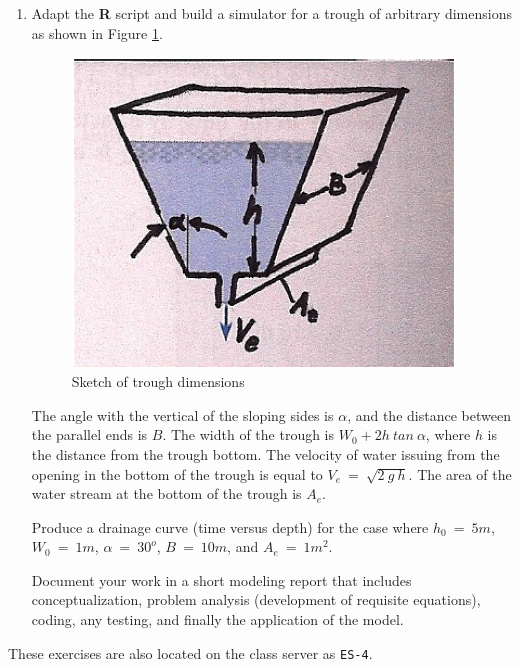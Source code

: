 \begin{enumerate}
\item Adapt the \textbf{R} script and build a simulator for a trough of arbitrary dimensions as shown in Figure \ref{fig:trough}.  

\begin{figure}[h!] %
   \centering
   \includegraphics[width=4in]{./4-TankDrain/trough.jpg} 
   \caption{Sketch of trough dimensions}
   \label{fig:trough}
\end{figure}

The angle with the vertical of the sloping sides is $\alpha$, and the distance between the parallel ends is $B$.  
The width of the trough is $W_0 + 2h~tan~\alpha$, where $h$ is the distance from the trough bottom.  
The velocity of water issuing from the opening in the bottom of the trough is equal to $V_e~=~\sqrt{2~g~h}$.  
The area of the water stream at the bottom of the trough is $A_e$.  

Produce a drainage curve (time versus depth) for the case where $h_0~=~5m$, $W_0~=~1m$, $\alpha~=~30^o$, $B~=~10m$, and $A_e~=~1m^2$.

Document your work in a short modeling report that includes conceptualization, problem analysis (development of requisite equations), coding, any testing, and finally the application of the model.  
\end{enumerate}

These exercises are also located on the class server as \texttt{ES-4}.
